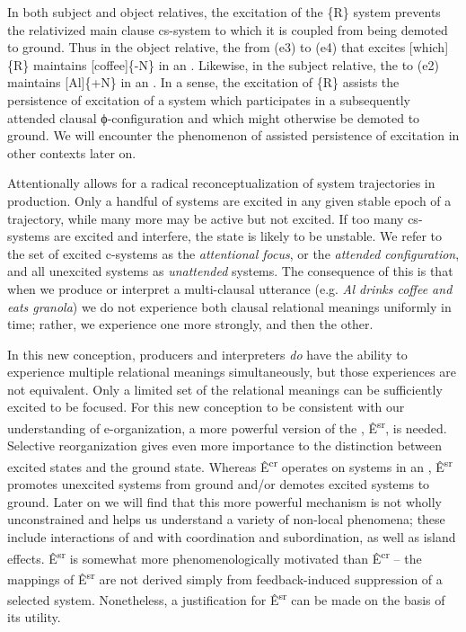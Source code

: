   In both subject and object relatives, the excitation of the \{R\} system prevents the relativized main clause cs-system to which it is coupled from being demoted to ground. Thus in the object relative, the  from (e3) to (e4) that excites [which]\{R\} maintains [coffee]\{-N\} in an . Likewise, in the subject relative, the  to (e2) maintains [Al]\{+N\} in an . In a sense, the excitation of \{R\} assists the persistence of excitation of a system which participates in a subsequently attended clausal ϕ-con\-fig\-u\-ra\-tion and which might otherwise be demoted to ground. We will encounter the phenomenon of assisted persistence of excitation in other contexts later on.

Attentionally  allows for a radical reconceptualization of system trajectories in production.  Only a handful of systems are excited in any given stable epoch of a trajectory, while many more may be active but not excited. If too many cs-systems are excited and interfere, the state is likely to be unstable. We refer to the set of excited c-systems as the \textit{attentional focus}, or the \textit{attended configuration}, and all unexcited systems as \textit{unattended} systems. The consequence of this is that when we produce or interpret a multi-clausal utterance (e.g. \textit{Al drinks coffee and eats granola}) we do not experience both clausal relational meanings uniformly in time; rather, we experience one  more strongly, and then the other.

  In this new conception, producers and interpreters \textit{do} have the ability to experience multiple relational meanings simultaneously, but those experiences are not equivalent. Only a limited set of the relational meanings can be sufficiently excited to be  focused. For this new conception to be consistent with our understanding of e-organization, a more powerful version of the , Ê\textsuperscript{sr},  is needed. Selective reorganization gives even more importance to the distinction between excited states and the ground state. Whereas Ê\textsuperscript{cr} operates on systems in an , Ê\textsuperscript{sr} promotes unexcited systems from ground and/or demotes excited systems to ground. Later on we will find that this more powerful mechanism is not wholly unconstrained and helps us understand a variety of non-local phenomena; these include interactions of  and  with coordination and subordination, as well as island effects. Ê\textsuperscript{sr} is somewhat more phenomenologically motivated than Ê\textsuperscript{cr} -- the mappings of Ê\textsuperscript{sr} are not derived simply from feedback-induced suppression of a selected system. Nonetheless, a justification for Ê\textsuperscript{sr} can be made on the basis of its utility.

